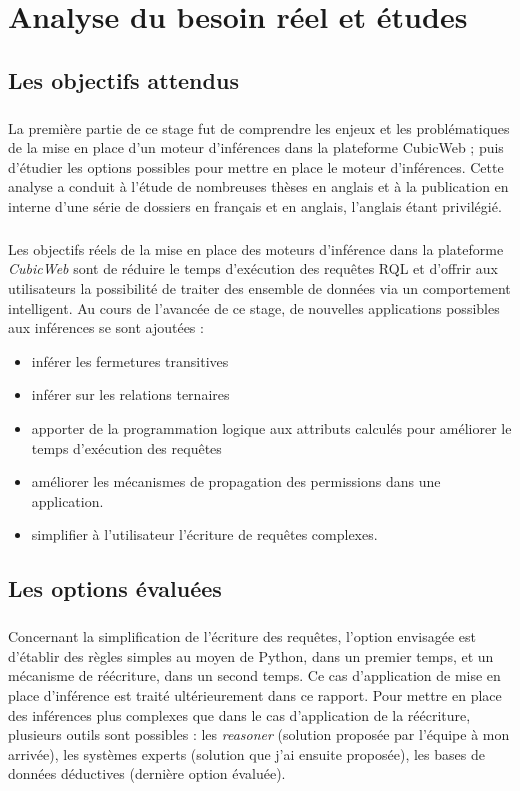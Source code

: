 \documentclass {report}
\begin{document}
\chapter{Analyse du besoin réel et études}
\section{Les objectifs attendus}
\paragraph{}
La première partie de ce stage fut de comprendre les enjeux et les problématiques de la mise en place d'un moteur d'inférences dans la plateforme CubicWeb ; puis d'étudier les options possibles pour mettre en place le moteur d'inférences. Cette analyse a conduit à l'étude de nombreuses thèses en anglais et à la publication en interne d'une série de dossiers en français et en anglais, l'anglais étant privilégié.
\paragraph{}
Les objectifs réels de la mise en place des moteurs d'inférence dans la plateforme \textit{CubicWeb} sont de réduire le temps d'exécution des requêtes RQL et d'offrir aux utilisateurs la possibilité de traiter des ensemble de données via un comportement intelligent. Au cours de l'avancée de ce stage, de nouvelles applications possibles aux inférences se sont ajoutées :
\begin{itemize}
\item inférer les fermetures transitives
\item inférer sur les relations ternaires
\item apporter de la programmation logique aux attributs calculés pour améliorer le temps d'exécution des requêtes
\item améliorer les mécanismes de propagation des permissions dans une application.
\item simplifier à l'utilisateur l'écriture de requêtes complexes.
\end{itemize}

\section{Les options évaluées}
\paragraph{}
Concernant la simplification de l'écriture des requêtes, l'option envisagée est d'établir des règles simples au moyen de Python, dans un premier temps, et un mécanisme de réécriture, dans un second temps. Ce cas d'application de mise en place d'inférence est traité ultérieurement dans ce rapport. Pour mettre en place des inférences plus complexes que dans le cas d'application de la réécriture, plusieurs outils sont possibles : les \textit{reasoner} (solution proposée par l'équipe à mon arrivée), les systèmes experts (solution que j'ai ensuite proposée), les bases de données déductives (dernière option évaluée).
\end{document}
